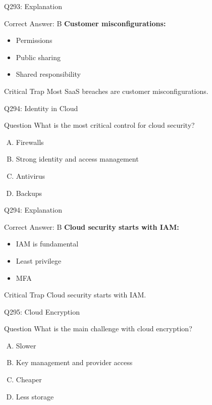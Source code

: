 \documentclass{beamer}
\begin{document}
	\begin{frame}{Q293: Explanation}
		\begin{block}{Correct Answer: B}
			\textbf{Customer misconfigurations:}
			\begin{itemize}
				\item Permissions
				\item Public sharing
				\item Shared responsibility
			\end{itemize}
		\end{block}
		\begin{alertblock}{Critical Trap}
			Most SaaS breaches are customer misconfigurations.
		\end{alertblock}
	\end{frame}
	
	\begin{frame}{Q294: Identity in Cloud}
		\begin{block}{Question}
			What is the most critical control for cloud security?
		\end{block}
		\begin{enumerate}[(A)]
			\item Firewalls
			\item Strong identity and access management
			\item Antivirus
			\item Backups
		\end{enumerate}
	\end{frame}
	
	\begin{frame}{Q294: Explanation}
		\begin{block}{Correct Answer: B}
			\textbf{Cloud security starts with IAM:}
			\begin{itemize}
				\item IAM is fundamental
				\item Least privilege
				\item MFA
			\end{itemize}
		\end{block}
		\begin{alertblock}{Critical Trap}
			Cloud security starts with IAM.
		\end{alertblock}
	\end{frame}
	
	\begin{frame}{Q295: Cloud Encryption}
		\begin{block}{Question}
			What is the main challenge with cloud encryption?
		\end{block}
		\begin{enumerate}[(A)]
			\item Slower
			\item Key management and provider access
			\item Cheaper
			\item Less storage
		\end{enumerate}
	\end{frame}
	
\end{document}
